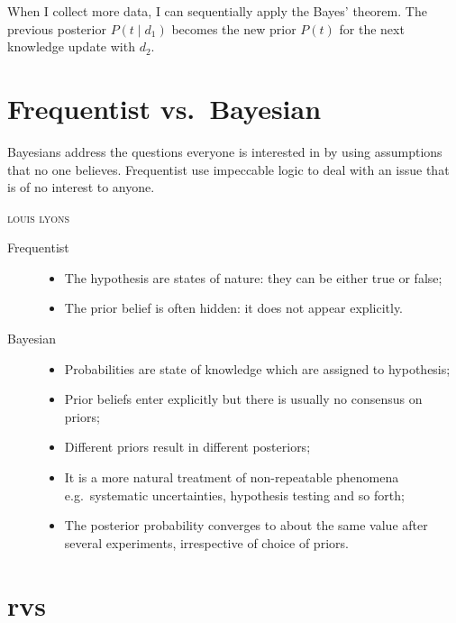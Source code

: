 \documentclass[
	10pt,
	draft
]{scrreprt}
\begin{document}
When I collect more data, I can sequentially apply the Bayes' theorem.
The previous posterior $P(t\mid d_1)$ becomes the new prior $P(t)$ for the next knowledge update with $d_2$.


		\section{Frequentist vs.~Bayesian}

{
\epigraph{%
Bayesians address the questions everyone is interested in by using assumptions that no one believes.
Frequentist use impeccable logic  to deal with an issue that is of no interest to anyone.
}{\footnotesize%
\textsc{louis lyons}%
}
}


\begin{description}
	\item[Frequentist]
\begin{itemize}
	\item
The hypothesis are states of nature: they can be either true or false;
	\item
The prior belief is often hidden: it does not appear explicitly.
\end{itemize}
	\item[Bayesian]
\begin{itemize}
	\item
Probabilities are state of knowledge which are assigned to hypothesis;
	\item
Prior beliefs enter explicitly but there is usually no consensus on priors;
	\item
Different priors result in different posteriors;
	\item
It is a more natural treatment of non-repeatable phenomena e.g.~systematic uncertainties, hypothesis testing and so forth;
	\item
The posterior probability converges to about the same value after several experiments, irrespective of choice of priors.
\end{itemize}
\end{description}

	\section{\aclp{rv}}
\end{document}
